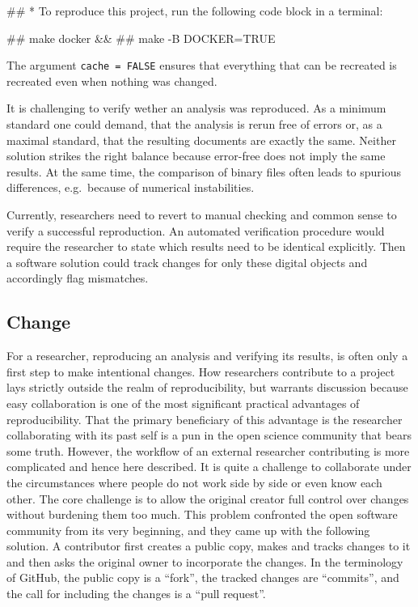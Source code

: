\documentclass[12pt,a4paper,twoside]{article}
\let\oldverbatim\verbatim
\let\endoldverbatim\endverbatim
\renewenvironment{verbatim}{\footnotesize\oldverbatim}{\endoldverbatim}
\begin{document}
\begin{verbatim}
## * To reproduce this project, run the following code block in a terminal:
\end{verbatim}

\begin{verbatim}
##   make docker &&
##   make -B DOCKER=TRUE
\end{verbatim}

The argument \texttt{cache\ =\ FALSE} ensures that everything that can be recreated is recreated even when nothing was changed.

It is challenging to verify wether an analysis was reproduced.
As a minimum standard one could demand, that the analysis is rerun free of errors or, as a maximal standard, that the resulting documents are exactly the same.
Neither solution strikes the right balance because error-free does not imply the same results.
At the same time, the comparison of binary files often leads to spurious differences, e.g.~because of numerical instabilities.

Currently, researchers need to revert to manual checking and common sense to verify a successful reproduction.
An automated verification procedure would require the researcher to state which results need to be identical explicitly.
Then a software solution could track changes for only these digital objects and accordingly flag mismatches.

\hypertarget{change}{%
\subsection{Change}\label{change}}

For a researcher, reproducing an analysis and verifying its results, is often only a first step to make intentional changes.
How researchers contribute to a project lays strictly outside the realm of reproducibility, but warrants discussion because easy collaboration is one of the most significant practical advantages of reproducibility.
That the primary beneficiary of this advantage is the researcher collaborating with its past self is a pun in the open science community that bears some truth.
However, the workflow of an external researcher contributing is more complicated and hence here described.
It is quite a challenge to collaborate under the circumstances where people do not work side by side or even know each other.
The core challenge is to allow the original creator full control over changes without burdening them too much.
This problem confronted the open software community from its very beginning, and they came up with the following solution.
A contributor first creates a public copy, makes and tracks changes to it and then asks the original owner to incorporate the changes.
In the terminology of GitHub, the public copy is a ``fork'', the tracked changes are ``commits'', and the call for including the changes is a ``pull request''.
\end{document}
